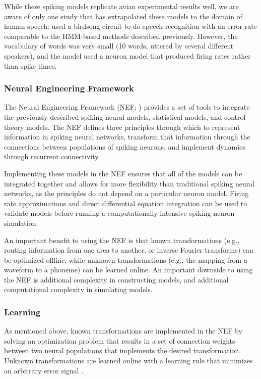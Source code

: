 \documentclass{article}
\begin{document}
While these spiking models
replicate avian experimental results well,
we are aware of only one study that
has extrapolated these models
to the domain of human speech:
\citet{yildiz2013} used a birdsong
circuit to do speech recognition
with an error rate comparable
to the HMM-based methods described previously.
However, the vocabulary of words was very small
(10 words, uttered by several different speakers),
and the model used a neuron model
that produced firing rates rather than spike times.

\subsubsection{Neural Engineering Framework}
\label{subsec:nef}

The Neural Engineering Framework (NEF; \citealp{eliasmith2003})
provides a set of tools to integrate
the previously described
spiking neural models,
statistical models,
and control theory models.
The NEF defines three principles
through which to represent
information in spiking neural networks,
transform that information through the connections
between populations of spiking neurons,
and implement dynamics through
recurrent connectivity.

Implementing these models
in the NEF ensures that all
of the models can be integrated together
and allows for more flexibility
than traditional spiking neural networks,
as the principles do not depend
on a particular neuron model.
Firing rate approximations
and direct differential equation integration
can be used to validate models
before running a computationally intensive
spiking neuron simulation.

An important benefit to using the NEF
is that known transformations
(e.g., routing information from one area
to another, or inverse Fourier transforms)
can be optimized offline,
while unknown transformations
(e.g., the mapping from a waveform
to a phoneme)
can be learned online.
An important downside to using the NEF
is additional complexity
in constructing models,
and additional computational complexity
in simulating models.

\subsubsection{Learning}
\label{subsec:learning}

As mentioned above, known transformations
are implemented in the NEF by solving
an optimization problem
that results in a set of connection weights
between two neural populations
that implements the desired transformation.
Unknown transformations are learned
online with a learning rule
that minimizes an arbitrary error signal
\citep{macneil2011}.
\end{document}
